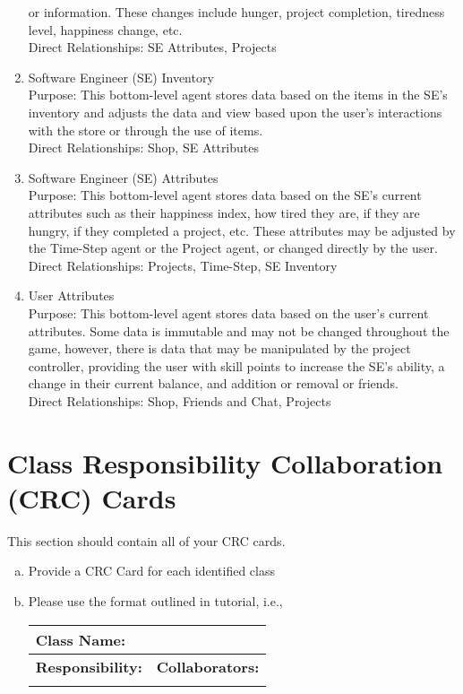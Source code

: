 \documentclass[]{article}
\begin{document}
\begin{enumerate}
    or information. These changes include hunger, project completion, tiredness 
    level, happiness change, etc.\\
    Direct Relationships: SE Attributes, Projects
    \item Software Engineer (SE) Inventory\\
    Purpose: This bottom-level agent stores data based on the items in the SE’s 
    inventory and adjusts the data and view based upon the user’s interactions 
    with the store or through the use of items.\\
    Direct Relationships: Shop, SE Attributes
    \item Software Engineer (SE) Attributes\\
    Purpose: This bottom-level agent stores data based on the SE’s current 
    attributes such as their happiness index, how tired they are, if they are 
    hungry, if they completed a project, etc. These attributes may be adjusted 
    by the Time-Step agent or the Project agent, or changed directly by the 
    user.\\
    Direct Relationships: Projects, Time-Step, SE Inventory
    \item User Attributes\\
    Purpose: This bottom-level agent stores data based on the user’s current 
    attributes. Some data is immutable and may not be changed throughout the 
    game, however, there is data that may be manipulated by the project 
    controller, providing the user with skill points to increase the SE’s 
    ability, a change in their current balance, and addition or removal or 
    friends.\\
    Direct Relationships: Shop, Friends and Chat, Projects
\end{enumerate}
	
\section{Class Responsibility Collaboration (CRC) Cards}
\label{sec:class_responsibility_collaboration_crc_cards}
This section should contain all of your CRC cards.

\begin{enumerate}[a)]
	\item Provide a CRC Card for each identified class
	\item Please use the format outlined in tutorial, i.e., 
	\begin{table}[ht]
		\centering
		\begin{tabular}{|p{5cm}|p{5cm}|}
		\hline 
		 \multicolumn{2}{|l|}{\textbf{Class Name:}} \\
		\hline
		\textbf{Responsibility:} & \textbf{Collaborators:} \\
		\hline
		\vspace{1in} & \\
		\hline
		\end{tabular}
	\end{table}
	
\end{enumerate}
\end{document}
